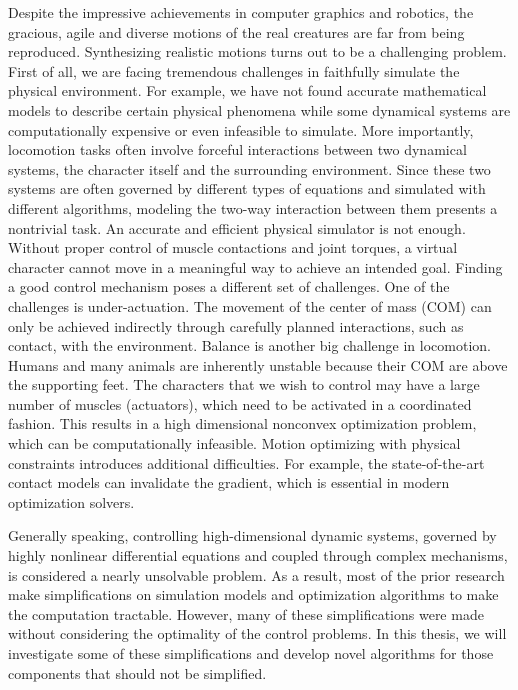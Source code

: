 Despite the impressive achievements in computer graphics and robotics, the gracious, agile and diverse motions of the real creatures are far from being reproduced. Synthesizing realistic motions turns out to be a challenging problem. First of all, we are facing tremendous challenges in faithfully simulate the physical environment. For example, we have not found accurate mathematical models to describe certain physical phenomena while some dynamical systems are computationally expensive or even infeasible to simulate. More importantly, locomotion tasks often involve forceful interactions between two dynamical systems, the character itself and the surrounding environment. Since these two systems are often governed by different types of equations and simulated with different algorithms, modeling the two-way interaction between them presents a nontrivial task. An accurate and efficient physical simulator is not enough. Without proper control of muscle contactions and joint torques, a virtual character cannot move in a meaningful way to achieve an intended goal. Finding a good control mechanism poses a different set of challenges. One of the challenges is under-actuation. The movement of the center of mass (COM) can only be achieved indirectly through carefully planned interactions, such as contact, with the environment. Balance is another big challenge in locomotion. Humans and many animals are inherently unstable because their COM are above the supporting feet. The characters that we wish to control may have a large number of muscles (actuators), which need to be activated in a coordinated fashion. This results in a high dimensional nonconvex optimization problem, which can be computationally infeasible. Motion optimizing with physical constraints introduces additional difficulties. For example, the state-of-the-art contact models can invalidate the gradient, which is essential in modern optimization solvers.

Generally speaking, controlling high-dimensional dynamic systems, governed by highly nonlinear differential equations and coupled through complex mechanisms, is considered a nearly unsolvable problem. As a result, most of the prior research make simplifications on simulation models and optimization algorithms to make the computation tractable. However, many of these simplifications were made without considering the optimality of the control problems. In this thesis, we will investigate some of these simplifications and develop novel algorithms for those components that should not be simplified. 


